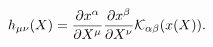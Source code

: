 \begin{equation}
h_{\mu\nu}(X)=\frac{\partial x^\alpha}{\partial X^\mu}
\frac{\partial x^\beta} {\partial X^\nu}{\cal
K}_{\alpha\beta}(x(X)).
\end{equation}

